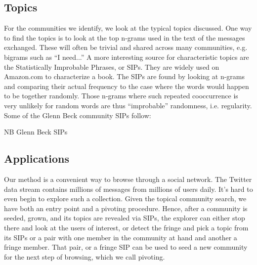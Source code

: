 \subsection{Topics}

For the communities we identify, we look at the typical topics discussed.  One way to find the topics is to look at the top n-grams used in the text of the messages exchanged.  These will often be trivial and shared across many communities, e.g. bigrams such as “I need...”  A more interesting source for characteristic topics are the Statistically Improbable Phrases, or SIPs.  They are widely used on Amazon.com to characterize a book.  The SIPs are found by looking at n-grams and comparing their actual frequency to the case where the words would happen to be together randomly.  Those n-grams where such repeated cooccurrence is very unlikely for random words are thus “improbable” randomness, i.e. regularity.  Some of the Glenn Beck community SIPs follow:

 
NB Glenn Beck SIPs


\subsection{Applications}

Our method is a convenient way to browse through a social network.  The Twitter data stream contains millions of messages from millions of users daily.  It’s hard to even begin to explore such a collection.  Given the topical community search, we have both an entry point and a pivoting procedure.  Hence, after a community is seeded, grown, and its topics are revealed via SIPs, the explorer can either stop there and look at the users of interest, or detect the fringe and pick a topic from its SIPs or a pair with one member in the community at hand and another a fringe member.  That pair, or a fringe SIP can be used to seed a new community for the next step of browsing, which we call pivoting.
